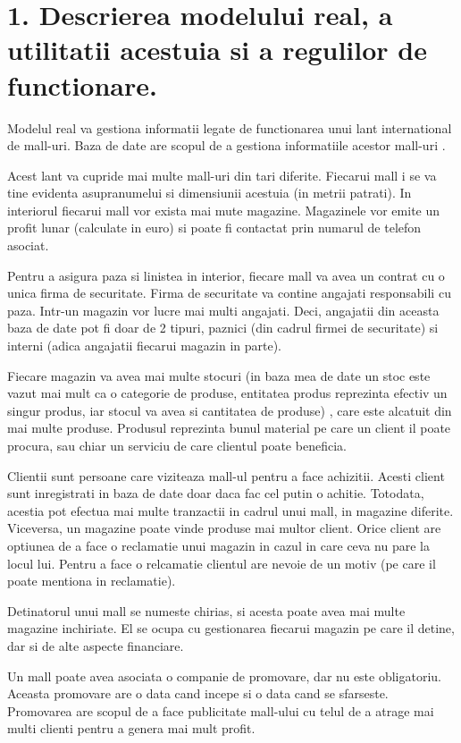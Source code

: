
\section*{1. Descrierea modelului real, a utilitatii acestuia si a regulilor de functionare.}

\vspace{1cm}

Modelul real va gestiona informatii legate de functionarea unui lant international de mall-uri. Baza de date are scopul de a gestiona informatiile acestor mall-uri . 

Acest lant va cupride mai multe mall-uri din tari diferite. Fiecarui mall i se va tine evidenta asupranumelui si dimensiunii acestuia (in metrii patrati). In interiorul fiecarui mall vor exista mai mute magazine. Magazinele vor emite un profit lunar (calculate in euro) si poate fi contactat prin numarul de telefon asociat. 

Pentru a asigura paza si linistea in interior,
fiecare mall va avea un contrat cu o unica firma de securitate. Firma de securitate va contine angajati responsabili cu paza. Intr-un magazin vor lucre mai multi angajati. Deci, angajatii din aceasta baza de date pot fi doar de 2 tipuri, paznici (din cadrul firmei de securitate) si interni (adica angajatii fiecarui magazin in parte). 

Fiecare magazin va avea mai multe stocuri (in baza mea de date un stoc este vazut mai mult ca o categorie de produse, entitatea produs reprezinta efectiv un singur produs, iar stocul va avea si cantitatea de produse) , care este alcatuit din mai multe produse. Produsul reprezinta bunul material pe care un client il poate procura, sau chiar un serviciu de care clientul poate beneficia. 

Clientii sunt persoane care viziteaza mall-ul pentru a face achizitii.
Acesti client sunt inregistrati in baza de date doar daca fac cel putin o achitie. Totodata, acestia pot efectua mai multe tranzactii in cadrul unui mall, in magazine diferite. Viceversa, un magazine poate vinde produse mai multor client. Orice client are optiunea de a face o reclamatie unui magazin in cazul in care ceva nu pare la locul lui. Pentru a face o relcamatie clientul are nevoie de un motiv (pe care il poate mentiona in reclamatie). 

Detinatorul unui mall se numeste chirias, si acesta poate avea mai multe
magazine inchiriate. El se ocupa cu gestionarea fiecarui magazin pe care il detine, dar si de alte aspecte financiare. 

Un mall poate avea asociata o companie de promovare, dar nu este obligatoriu. Aceasta promovare are o data cand incepe si o data cand se sfarseste. Promovarea are scopul de a face publicitate mall-ului cu telul de a atrage mai multi clienti pentru a genera mai mult profit. 
